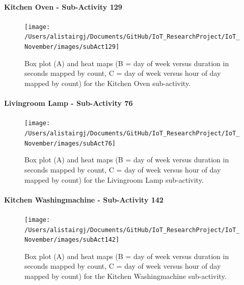 \documentclass[11pt,]{article}
\let\oldparagraph\paragraph
\renewcommand{\paragraph}[1]{\oldparagraph{#1}\mbox{}}
\begin{document}
\hypertarget{kitchen-oven---sub-activity-129}{%
\paragraph{Kitchen Oven - Sub-Activity
129}\label{kitchen-oven---sub-activity-129}}

\begin{figure}[H]

{\centering \texttt{[image: /Users/alistairgj/Documents/GitHub/IoT\_ResearchProject/IoT\_November/images/subAct129]} 

}

\caption{Box plot (A) and heat maps (B = day of week versus duration in seconds mapped by count, C = day of week versus hour of day mapped by count) for the Kitchen Oven sub-activity.}\label{fig:subAct129}
\end{figure}

\hypertarget{livingroom-lamp---sub-activity-76}{%
\paragraph{Livingroom Lamp - Sub-Activity
76}\label{livingroom-lamp---sub-activity-76}}

\begin{figure}[H]

{\centering \texttt{[image: /Users/alistairgj/Documents/GitHub/IoT\_ResearchProject/IoT\_November/images/subAct76]} 

}

\caption{Box plot (A) and heat maps (B = day of week versus duration in seconds mapped by count, C = day of week versus hour of day mapped by count) for the Livingroom Lamp sub-activity.}\label{fig:subAct76}
\end{figure}

\hypertarget{kitchen-washingmachine---sub-activity-142}{%
\paragraph{Kitchen Washingmachine - Sub-Activity
142}\label{kitchen-washingmachine---sub-activity-142}}

\begin{figure}[H]

{\centering \texttt{[image: /Users/alistairgj/Documents/GitHub/IoT\_ResearchProject/IoT\_November/images/subAct142]} 

}

\caption{Box plot (A) and heat maps (B = day of week versus duration in seconds mapped by count, C = day of week versus hour of day mapped by count) for the Kitchen Washingmachine sub-activity.}\label{fig:subAct142}
\end{figure}
\end{document}
